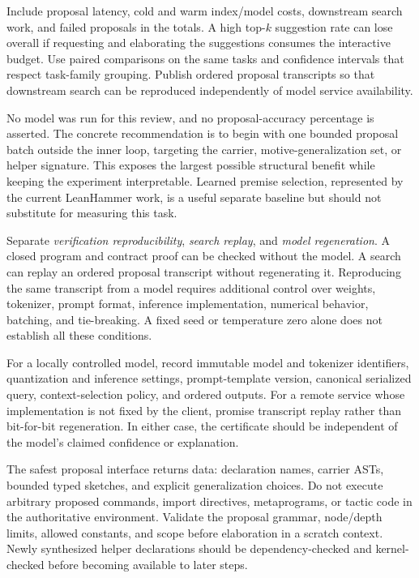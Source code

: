 Include proposal latency, cold and warm index/model costs, downstream search work, and failed proposals in the totals. A high top-$k$ suggestion rate can lose overall if requesting and elaborating the suggestions consumes the interactive budget. Use paired comparisons on the same tasks and confidence intervals that respect task-family grouping. Publish ordered proposal transcripts so that downstream search can be reproduced independently of model service availability.

No model was run for this review, and no proposal-accuracy percentage is asserted. The concrete recommendation is to begin with one bounded proposal batch outside the inner loop, targeting the carrier, motive-generalization set, or helper signature. This exposes the largest possible structural benefit while keeping the experiment interpretable. Learned premise selection, represented by the current LeanHammer work, is a useful separate baseline but should not substitute for measuring this task.\cite{leanhammer}


\answer Separate \emph{verification reproducibility}, \emph{search replay}, and \emph{model regeneration}. A closed program and contract proof can be checked without the model. A search can replay an ordered proposal transcript without regenerating it. Reproducing the same transcript from a model requires additional control over weights, tokenizer, prompt format, inference implementation, numerical behavior, batching, and tie-breaking. A fixed seed or temperature zero alone does not establish all these conditions.

For a locally controlled model, record immutable model and tokenizer identifiers, quantization and inference settings, prompt-template version, canonical serialized query, context-selection policy, and ordered outputs. For a remote service whose implementation is not fixed by the client, promise transcript replay rather than bit-for-bit regeneration. In either case, the certificate should be independent of the model's claimed confidence or explanation.

The safest proposal interface returns data: declaration names, carrier ASTs, bounded typed sketches, and explicit generalization choices. Do not execute arbitrary proposed commands, import directives, metaprograms, or tactic code in the authoritative environment. Validate the proposal grammar, node/depth limits, allowed constants, and scope before elaboration in a scratch context. Newly synthesized helper declarations should be dependency-checked and kernel-checked before becoming available to later steps.

